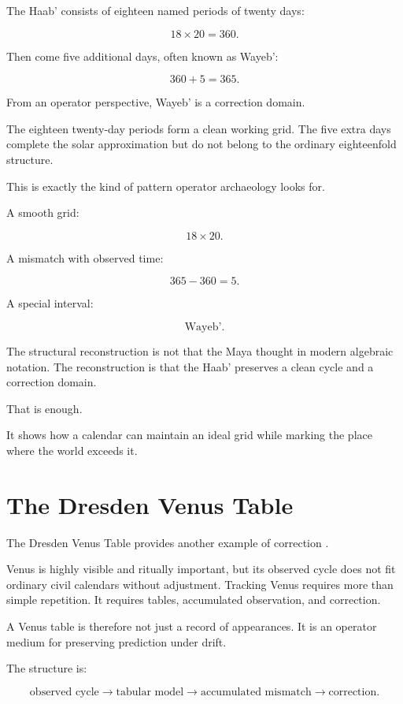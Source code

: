 \documentclass[11pt]{book}
\begin{document}
The Haab' consists of eighteen named periods of twenty days:

\[
18 \times 20 = 360.
\]

Then come five additional days, often known as Wayeb':

\[
360 + 5 = 365.
\]

From an operator perspective, Wayeb' is a correction domain.

The eighteen twenty-day periods form a clean working grid. The five extra days complete the solar approximation but do not belong to the ordinary eighteenfold structure.

This is exactly the kind of pattern operator archaeology looks for.

A smooth grid:

\[
18 \times 20.
\]

A mismatch with observed time:

\[
365 - 360 = 5.
\]

A special interval:

\[
\text{Wayeb'}.
\]

The structural reconstruction is not that the Maya thought in modern algebraic notation. The reconstruction is that the Haab' preserves a clean cycle and a correction domain.

That is enough.

It shows how a calendar can maintain an ideal grid while marking the place where the world exceeds it.

\section{The Dresden Venus Table}

The Dresden Venus Table provides another example of correction \cite{BrickerBricker2011AstronomyMayaCodices,Aveni2001Skywatchers}.

Venus is highly visible and ritually important, but its observed cycle does not fit ordinary civil calendars without adjustment. Tracking Venus requires more than simple repetition. It requires tables, accumulated observation, and correction.

A Venus table is therefore not just a record of appearances. It is an operator medium for preserving prediction under drift.

The structure is:

\[
\text{observed cycle}
\rightarrow
\text{tabular model}
\rightarrow
\text{accumulated mismatch}
\rightarrow
\text{correction}.
\]
\end{document}
